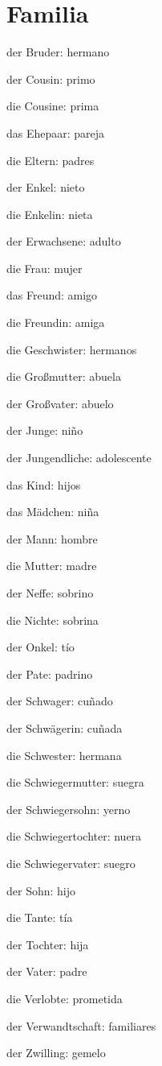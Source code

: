 \section{Familia}
\begin{multicols}{2}
\begin{myitemize}
\item der Bruder: hermano
\item der Cousin: primo
\item die Cousine: prima
\item das Ehepaar: pareja
\item die Eltern: padres
\item der Enkel: nieto
\item die Enkelin: nieta
\item der Erwachsene: adulto
\item die Frau: mujer
\item das Freund: amigo
\item die Freundin: amiga
\item die Geschwister: hermanos
\item die Großmutter: abuela
\item der Großvater: abuelo
\item der Junge: niño
\item der Jungendliche: adolescente
\item das Kind: hijos
\item das Mädchen: niña
\item der Mann: hombre
\item die Mutter: madre
\item der Neffe: sobrino
\item die Nichte: sobrina
\item der Onkel: tío
\item der Pate: padrino
\item der Schwager: cuñado
\item der Schwägerin: cuñada
\item die Schwester: hermana
\item die Schwiegermutter: suegra
\item der Schwiegersohn: yerno
\item die Schwiegertochter: nuera
\item die Schwiegervater: suegro
\item der Sohn: hijo
\item die Tante: tía
\item der Tochter: hija
\item der Vater: padre
\item die Verlobte: prometida
\item der Verwandtschaft: familiares
\item der Zwilling: gemelo
\end{myitemize}
\end{multicols}


